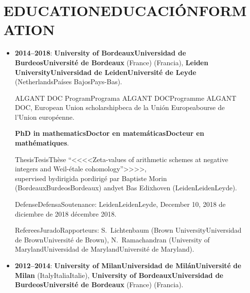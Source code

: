 \documentclass{article}
\newcommand{\biling}[3]{\ifdefined\english#1\fi\ifdefined\spanish#2\fi\ifdefined\french#3\fi}
\begin{document}
\vspace{1em}

{\color{RoyalBlue}\section*{\biling{EDUCATION}{EDUCACIÓN}{FORMATION}}}

\begin{itemize}
\item \textbf{2014--2018}: \textbf{\biling{University of Bordeaux}{Universidad de Burdeos}{Université de Bordeaux}}\biling{ (France)}{ (Francia)}{},
  \textbf{\biling{Leiden University}{Universidad de Leiden}{Université de Leyde}} (\biling{Netherlands}{Países Bajos}{Pays-Bas}).

  \biling{ALGANT DOC Program}{Programa ALGANT DOC}{Programme ALGANT DOC}, \biling{European Union scholarship}{beca de la Unión Europea}{bourse de l'Union européenne}.

  \textbf{\biling{PhD in mathematics}{Doctor en matemáticas}{Docteur en mathématiques}}.

  \biling{Thesis}{Tesis}{Thèse} \biling{``}{<<}{<<}Zeta-values of arithmetic schemes at negative integers and Weil-étale cohomology\biling{''}{>>}{>>},\\
  \biling{supervised by}{dirigida por}{dirigé par} Baptiste Morin (\biling{Bordeaux}{Burdeos}{Bordeaux}) \biling{and}{y}{et} Bas Edixhoven (\biling{Leiden}{Leiden}{Leyde}).

  \biling{Defense}{Defensa}{Soutenance}: \biling{Leiden}{Leiden}{Leyde}, \biling{December 10, 2018}{10 de diciembre de 2018}{10 décembre 2018}.

  \biling{Referees}{Jurado}{Rapporteurs}:
  S.~Lichtenbaum (\biling{Brown University}{Universidad de Brown}{Université de Brown}),
  N.~Ramachandran (\biling{University of Maryland}{Universidad de Maryland}{Université de Maryland}).

\iffalse
  \biling{Examining committee}{Jurado}:
  P.~Cassou-Noguès (Université de Bordeaux),
  Ph.~Cassou-Noguès (Université de Bordeaux),
  D.~Holmes (Universiteit Leiden)
  R.~de Jeu (Vrije Universiteit Amsterdam),
  W.~van der Kallen (Universiteit Utrecht),
  H.~Lenstra (Universiteit Leiden),
  P.~Stevenhagen (Universiteit Leiden).
\fi

\item \textbf{2012--2014}: \textbf{\biling{University of Milan}{Universidad de Milán}{Université de Milan}} (\biling{Italy}{Italia}{Italie}),
  \textbf{\biling{University of Bordeaux}{Universidad de Burdeos}{Université de Bordeaux}}\biling{ (France)}{ (Francia)}{}.


\end{itemize}
\end{document}
